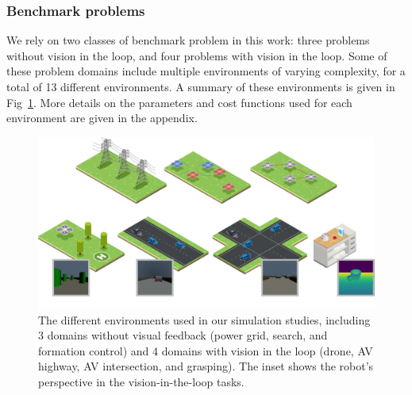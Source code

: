 \subsubsection{Benchmark problems}

We rely on two classes of benchmark problem in this work: three problems without vision in the loop, and four problems with vision in the loop. Some of these problem domains include multiple environments of varying complexity, for a total of 13 different environments. A summary of these environments is given in Fig~\ref{ch:corl:fig:environments}. More details on the parameters and cost functions used for each environment are given in the appendix.

\begin{figure}[t]
    \centering
    \includegraphics[width=\linewidth]{images/corl/all_examples.png}
    \caption{The different environments used in our simulation studies, including 3 domains without visual feedback (power grid, search, and formation control) and 4 domains with vision in the loop (drone, AV highway, AV intersection, and grasping). The inset shows the robot's perspective in the vision-in-the-loop tasks.}\label{ch:corl:fig:environments}
\end{figure}

